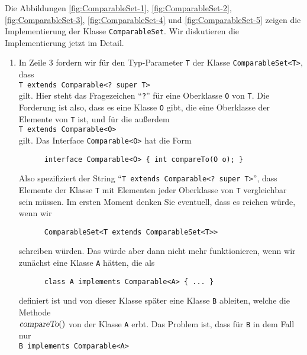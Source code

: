 Die Abbildungen 
\ref{fig:ComparableSet-1}, \ref{fig:ComparableSet-2}, \ref{fig:ComparableSet-3},
\ref{fig:ComparableSet-4} und \ref{fig:ComparableSet-5}
zeigen die Implementierung der Klasse \texttt{ComparableSet}.  Wir diskutieren die
Implementierung jetzt im Detail.
\begin{enumerate}
\item In Zeile 3 fordern wir f\"ur den Typ-Parameter \texttt{T} der Klasse
      \texttt{ComparableSet<T>}, dass
      \\[0.2cm]
      \hspace*{1.3cm}
      \texttt{T extends Comparable<? super T>}
      \\[0.2cm]
      gilt.  Hier steht das Fragezeichen ``\texttt{?}'' f\"ur eine Oberklasse \texttt{O}
      von \texttt{T}.  Die Forderung ist also, dass es eine Klasse \texttt{O} gibt, die
      eine Oberklasse der Elemente von \texttt{T} ist, und f\"ur die au\ss{}erdem
      \\[0.2cm]
      \hspace*{1.3cm}
      \texttt{T extends Comparable<O>}
      \\[0.2cm]
      gilt.  Das Interface \texttt{Comparable<O>} hat die Form
      \begin{verbatim}
      interface Comparable<O> { int compareTo(O o); }
      \end{verbatim}
      Also spezifiziert der String ``\texttt{T extends Comparable<? super T>}'', dass
      Elemente der Klasse \texttt{T} mit Elementen jeder Oberklasse von \texttt{T}
      vergleichbar sein m\"ussen.  Im ersten Moment denken Sie eventuell, dass es reichen
      w\"urde, wenn wir 
\begin{verbatim}
      ComparableSet<T extends ComparableSet<T>>
\end{verbatim}
      schreiben w\"urden.  Das w\"urde aber dann nicht mehr funktionieren, wenn wir zun\"achst
      eine Klasse \texttt{A} h\"atten, die als
\begin{verbatim}
      class A implements Comparable<A> { ... }
\end{verbatim}
      definiert ist und von dieser Klasse sp\"ater eine Klasse \texttt{B} ableiten, welche die
      Methode\\
      $\textsl{compareTo}()$ von der Klasse \texttt{A} erbt.  Das Problem ist,
      dass f\"ur \texttt{B} in dem Fall nur
      \\[0.2cm]
      \hspace*{1.3cm}
      \texttt{B implements Comparable<A>}
      \\[0.2cm]

\end{enumerate}
